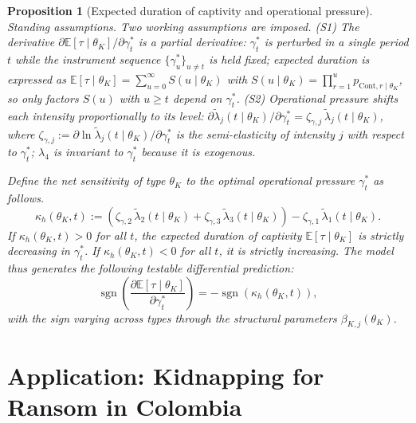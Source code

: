 \documentclass[review,authoryear,12pt]{elsarticle}
\theoremstyle{plain}
\newtheorem{proposition}[theorem]{Proposition}
\theoremstyle{definition}
\newcommand{\1}{\mathbf{1}}
\begin{document}
\begin{proposition}[Expected duration of captivity and operational pressure]
\label{prop:expected-captivity-gamma}
\noindent\textit{Standing assumptions.} Two working assumptions are imposed. \textup{(S1)} The derivative $\partial\mathbb{E}[\tau\mid\theta_K]/\partial\gamma_t^\ast$ is a partial derivative: $\gamma_t^\ast$ is perturbed in a single period $t$ while the instrument sequence $\{\gamma_u^\ast\}_{u\neq t}$ is held fixed; expected duration is expressed as $\mathbb{E}[\tau\mid\theta_K]=\sum_{u=0}^{\infty}S(u\mid\theta_K)$ with $S(u\mid\theta_K)=\prod_{r=1}^{u}p_{\mathrm{Cont},r\mid\theta_K}$, so only factors $S(u)$ with $u\geq t$ depend on $\gamma_t^\ast$. \textup{(S2)} Operational pressure shifts each intensity proportionally to its level: $\partial\tilde{\lambda}_j(t\mid\theta_K)/\partial\gamma_t^\ast=\zeta_{\gamma,j}\,\tilde{\lambda}_j(t\mid\theta_K)$, where $\zeta_{\gamma,j}:=\partial\ln\tilde{\lambda}_j(t\mid\theta_K)/\partial\gamma_t^\ast$ is the semi-elasticity of intensity $j$ with respect to $\gamma_t^\ast$; $\lambda_4$ is invariant to $\gamma_t^\ast$ because it is exogenous.

\medskip
Define the net sensitivity of type $\theta_K$ to the optimal operational pressure $\gamma_t^\ast$ as follows.
\begin{equation}
\label{eq:kappa-c}
\kappa_h(\theta_K, t) := \left( \zeta_{\gamma,2}\, \tilde{\lambda}_2(t \mid \theta_K) + \zeta_{\gamma,3}\, \tilde{\lambda}_3(t \mid \theta_K) \right) - \zeta_{\gamma,1}\, \tilde{\lambda}_1(t \mid \theta_K).
\end{equation}
If $\kappa_h(\theta_K, t) > 0$ for all $t$, the expected duration of captivity $\mathbb{E}[\tau \mid \theta_K]$ is strictly decreasing in $\gamma_t^\ast$. If $\kappa_h(\theta_K, t) < 0$ for all $t$, it is strictly increasing. The model thus generates the following testable differential prediction:
\begin{equation}
\operatorname{sgn} \left( \frac{\partial \mathbb{E}[\tau \mid \theta_K]}{\partial \gamma_t^\ast} \right) = - \operatorname{sgn}(\kappa_h(\theta_K, t)),
\end{equation}
with the sign varying across types through the structural parameters $\beta_{K,j}(\theta_K)$.
\end{proposition}

\section{Application: Kidnapping for Ransom in Colombia}\label{sec:application}
\end{document}
